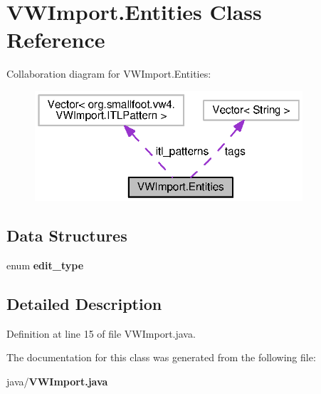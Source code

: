 \section{V\-W\-Import.\-Entities Class Reference}
\label{classorg_1_1smallfoot_1_1vw4_1_1VWImport_1_1Entities}


Collaboration diagram for V\-W\-Import.\-Entities\-:\nopagebreak
\begin{figure}[H]
\begin{center}
\leavevmode
\includegraphics[width=282pt]{classorg_1_1smallfoot_1_1vw4_1_1VWImport_1_1Entities__coll__graph}
\end{center}
\end{figure}
\subsection*{Data Structures}
\begin{DoxyCompactItemize}
\item 
enum {\bf edit\-\_\-type}
\end{DoxyCompactItemize}


\subsection{Detailed Description}


Definition at line 15 of file V\-W\-Import.\-java.



The documentation for this class was generated from the following file\-:\begin{DoxyCompactItemize}
\item 
java/{\bf V\-W\-Import.\-java}\end{DoxyCompactItemize}
